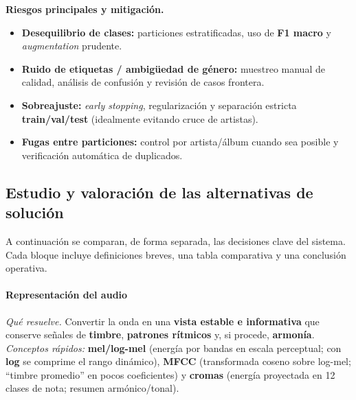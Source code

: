 \documentclass[12pt,twoside]{article}
\begin{document}
\textbf{Riesgos principales y mitigación.}
\begin{itemize}
  \item \textbf{Desequilibrio de clases:} particiones estratificadas, uso de \textbf{F1 macro} y \textit{augmentation} prudente.
  \item \textbf{Ruido de etiquetas / ambigüedad de género:} muestreo manual de calidad, análisis de confusión y revisión de casos frontera.
  \item \textbf{Sobreajuste:} \textit{early stopping}, regularización y separación estricta \textbf{train/val/test} (idealmente evitando cruce de artistas).
  \item \textbf{Fugas entre particiones:} control por artista/álbum cuando sea posible y verificación automática de duplicados.
\end{itemize}

\subsection{Estudio y valoración de las alternativas de solución}\label{subsec:viabilidad-alternativas}

A continuación se comparan, de forma separada, las decisiones clave del sistema. Cada bloque incluye definiciones breves, una tabla comparativa y una conclusión operativa.

\paragraph*{Representación del audio}

\textit{Qué resuelve.} Convertir la onda en una \textbf{vista estable e informativa} que conserve señales de \textbf{timbre}, \textbf{patrones rítmicos} y, si procede, \textbf{armonía}. \textit{Conceptos rápidos:}
\textbf{mel/log-mel} (energía por bandas en escala perceptual; con \textbf{log} se comprime el rango dinámico),
\textbf{MFCC} (transformada coseno sobre log-mel; “timbre promedio” en pocos coeficientes) y
\textbf{cromas} (energía proyectada en 12 clases de nota; resumen armónico/tonal).
\end{document}
